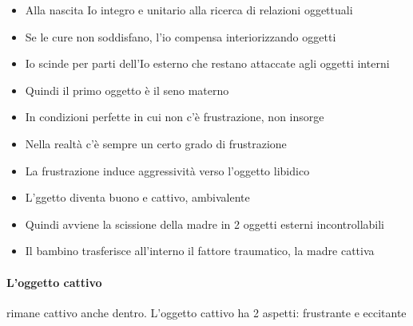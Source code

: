 \documentclass[12pt, a4paper]{article}
\begin{document}
\begin{itemize}
    \item Alla nascita Io integro e unitario alla ricerca di relazioni oggettuali
    \item Se le cure non soddisfano, l'io compensa interiorizzando oggetti
    \item Io scinde per parti dell'Io esterno che restano attaccate agli oggetti interni
    \item Quindi il primo oggetto \`e il seno materno
    \item In condizioni perfette in cui non c'\`e frustrazione, non insorge \ambivalenza
    \item Nella realt\`a c'\`e sempre un certo grado di frustrazione
    \item La frustrazione induce aggressivit\`a verso l'oggetto libidico
    \item L'ggetto diventa buono e cattivo, ambivalente
    \item Quindi avviene la scissione della madre in 2 oggetti esterni incontrollabili
    \item Il bambino trasferisce all'interno il fattore traumatico, la madre cattiva
\end{itemize}

\paragraph{L'oggetto cattivo} rimane cattivo anche dentro. L'oggetto cattivo ha 2 aspetti: frustrante e eccitante
\end{document}
